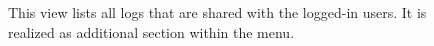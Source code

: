 \documentclass[../main.tex]{subfiles}
\begin{document}
\begin{figure}[h!]
    \centering
    \caption[Clotilde Ui: Shared logs]{
        This view lists all logs that are shared with the logged-in users.
        It is realized as additional section within the menu.
    }
    \label{app:clotilde-shared}
\end{figure}
\end{document}
